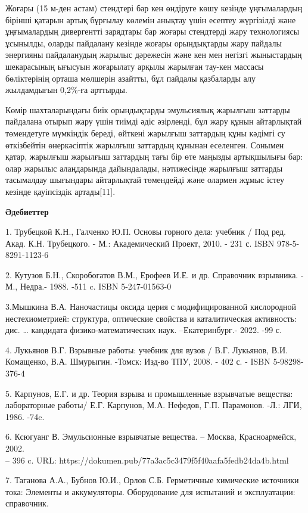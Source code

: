 Жоғары (15 м-ден астам) стендтері бар кен өндіруге көшу кезінде
ұңғымалардың бірінші қатарын артық бұрғылау көлемін анықтау үшін есептеу
жүргізілді және ұңғымалардың дивергентті зарядтары бар жоғары стендтерді
жару технологиясы ұсынылды, оларды пайдалану кезінде жоғары орындықтарды
жару пайдалы энергияны пайдаланудың жарылыс дәрежесін және кен мен
негізгі жыныстардың шекарасының ығысуын жоғарылату арқылы жарылған
тау-кен массасы бөліктерінің орташа мөлшерін азайтты, бұл пайдалы
қазбаларды алу жылдамдығын 0,2\%-ға арттырды.

Көмір шахталарындағы биік орындықтарды эмульсиялық жарылғыш заттарды
пайдалана отырып жару үшін тиімді әдіс әзірленді, бұл жару құнын
айтарлықтай төмендетуге мүмкіндік береді, өйткені жарылғыш заттардың
құны кәдімгі су өткізбейтін өнеркәсіптік жарылғыш заттардың құнынан
еселенген. Сонымен қатар, жарылғыш жарылғыш заттардың тағы бір өте
маңызды артықшылығы бар: олар жарылыс алаңдарында дайындалады,
нәтижесінде жарылғыш заттарды тасымалдау шығындары айтарлықтай
төмендейді және олармен жұмыс істеу кезінде қауіпсіздік артады{[}11{]}.

{\bfseries Әдебиеттер}

1. Трубецкой К.Н., Галченко Ю.П. Основы горного дела: учебник / Под ред.
Акад. К.Н. Трубецкого. - М.: Академический Проект, 2010. - 231 с. ISBN
978-5-8291-1123-6

2. Кутузов Б.Н., Скоробогатов В.М., Ерофеев И.Е. и др. Справочник
взрывника. - М., Недра.- 1988. -511 c. ISBN 5-247-01563-0

3.Мышкина В.А. Наночастицы оксида церия с модифицированной кислородной
нестехиометрией: структура, оптические свойства и каталитическая
активность: дис. \ldots{} кандидата физико-математических наук.
--Екатеринбург.- 2022. -99 с.

4. Лукьянов В.Г. Взрывные работы: учебник для вузов / В.Г. Лукьянов,
В.И. Комащенко, В.А. Шмурыгин. -Томск: Изд-во ТПУ, 2008. - 402 с. - ISBN
5-98298-376-4

5. Карпунов, Е.Г. и др. Теория взрыва и промышленные взрывчатые
вещества: лабораторные работы/ Е.Г. Карпунов, М.А. Нефедов, Г.П.
Парамонов. -Л.: ЛГИ, 1986. -74c.

6. Ксюгуанг В. Эмульсионные взрывчатые вещества. -- Москва,
Красноармейск, 2002.\\
-- 396 c. URL: https://dokumen.pub/77a3ac5c3479f5f40aafa5fedb24da4b.html

7. Таганова А.А., Бубнов Ю.И., Орлов С.Б. Герметичные химические
источники тока: Элементы и аккумуляторы. Оборудование для испытаний и
эксплуатации: справочник.

